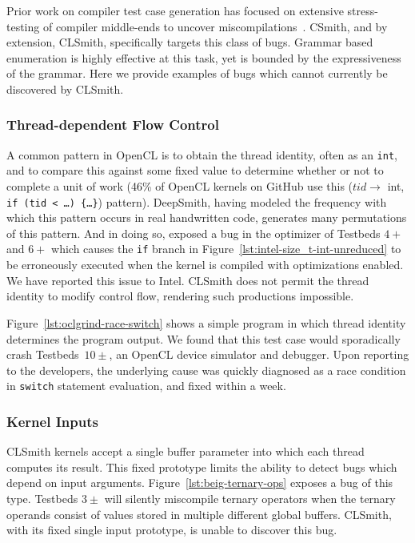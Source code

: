 Prior work on compiler test case generation has focused on extensive stress-
testing of compiler middle-ends to uncover miscompilations~\cite{Chen2014a}.
CSmith, and by extension, CLSmith, specifically targets this class of bugs.
Grammar based enumeration is highly effective at this task, yet is bounded by
the expressiveness of the grammar. Here we provide examples of bugs which cannot
currently be discovered by CLSmith.

\subsubsection{Thread-dependent Flow Control}

A common pattern in OpenCL is to obtain the thread identity, often as an
\texttt{int}, and to compare this against some fixed value to determine whether
or not to complete a unit of work (46\% of OpenCL kernels on GitHub use this
($tid \rightarrow$ int, \texttt{if (tid < \ldots) \{\ldots\}}) pattern).
DeepSmith, having modeled the frequency with which this pattern occurs in real
handwritten code, generates many permutations of this pattern. And in doing so,
exposed a bug in the optimizer of Testbeds $4+$ and $6+$ which causes the
\texttt{if} branch in Figure~\ref{lst:intel-size_t-int-unreduced} to be
erroneously executed when the kernel is compiled with optimizations enabled. We
have reported this issue to Intel. CLSmith does not permit the thread identity
to modify control flow, rendering such productions impossible.

Figure~\ref{lst:oclgrind-race-switch} shows a simple program in which thread
identity determines the program output. We found that this test case would
sporadically crash Testbeds~$10\pm$, an OpenCL device simulator and debugger.
Upon reporting to the developers, the underlying cause was quickly diagnosed as
a race condition in \texttt{switch} statement evaluation, and fixed within a
week.

\subsubsection{Kernel Inputs}

CLSmith kernels accept a single buffer parameter into which each thread computes
its result. This fixed prototype limits the ability to detect bugs which depend
on input arguments. Figure~\ref{lst:beig-ternary-ops} exposes a bug of this
type. Testbeds $3\pm$ will silently miscompile ternary operators when the
ternary operands consist of values stored in multiple different global buffers.
CLSmith, with its fixed single input prototype, is unable to discover this bug.

